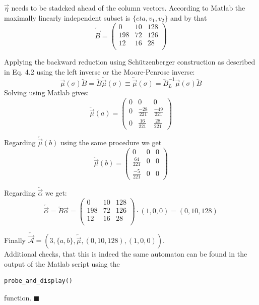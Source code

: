         $\overrightarrow{\eta}$ needs to be stadcked ahead of the column vectors. According to Matlab the maximally linearly independent subset is $\{eta, v_1, v_2\}$ and by that
        \[ \overleftarrow{\overrightarrow{B}} = \begin{pmatrix}
                                    0 & 10 & 128 \\
                                    198 & 72 & 126 \\
                                    12 & 16 & 28  \\
                                \end{pmatrix}
        \]
        
        Applying the backward reduction using Schützenberger construction as described in \autocite{Kiefer2013OnTC} Eq. 4.2 using the left inverse or the Moore-Penrose inverse:
        \[ \overrightarrow{\mu}(\sigma) \overleftarrow{B} = \overleftarrow{B}\overleftarrow{\overrightarrow{\mu}}(\sigma) \equiv \overleftarrow{\overrightarrow{\mu}}(\sigma) = \overleftarrow{B}^{-1}_L  \overrightarrow{\mu}(\sigma) \overleftarrow{B} \]
        Solving using Matlab gives:
        \[
        \overleftarrow{\overrightarrow{\mu}}(a) = 
        \begin{pmatrix}
            0 & 0 & 0 \\
            0 & \frac{-28}{221} & \frac{-49}{221} \\
            0 & \frac{16}{221} & \frac{28}{221}
        \end{pmatrix}
       \]
        
            
        Regarding $\overleftarrow{\overrightarrow{\mu}}(b)$ using the same procedure we get
        \[ \overleftarrow{\overrightarrow{\mu}}(b) = 
            \begin{pmatrix}
                0 & 0 & 0 \\
                \frac{64}{221} & 0 & 0 \\
                \frac{-5}{221} & 0 & 0
            \end{pmatrix}
        \] 
        
        Regarding $\overleftarrow{\overrightarrow{\alpha}}$ we get:
        \[ \overleftarrow{\overrightarrow{\alpha}} = \overleftarrow{B} \overrightarrow{\alpha} =  \begin{pmatrix}
            0 & 10 & 128 \\
            198 & 72 & 126 \\
            12 & 16 & 28  \\
        \end{pmatrix} \cdot (1,0,0) = (0, 10, 128) \]
            
            
        Finally $\overleftarrow{\overrightarrow{\mathcal{A}}} = (3, \{a, b\}, \overleftarrow{\overrightarrow{\mu}}, (0, 10, 128), (1,0,0))$. \\

        Additional checks, that this is indeed the same automaton can be found in the output of the Matlab script using the \begin{verbatim}probe_and_display()\end{verbatim} function. \hfill $\blacksquare$
        \newpage
        
            
        
